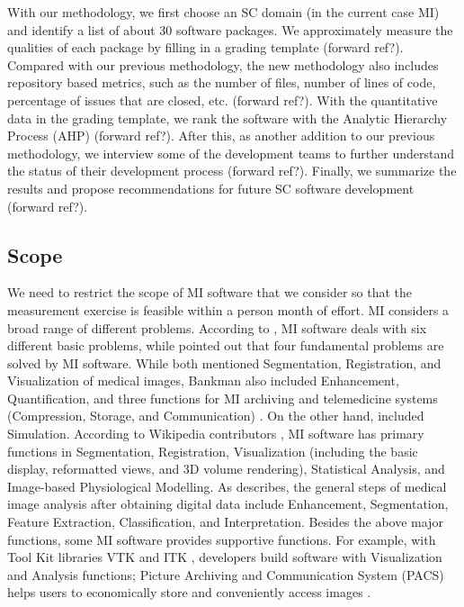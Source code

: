 \documentclass[preprint,12pt,authoryear]{elsarticle}
\begin{document}
With our methodology, we first choose an SC domain (in the current case MI) and
identify a list of about 30 software packages. We approximately measure the
qualities of each package by filling in a grading template (forward ref?).
Compared with our previous methodology, the new methodology also includes
repository based metrics, such as the number of files, number of lines of code,
percentage of issues that are closed, etc. (forward ref?).  With the
quantitative data in the grading template, we rank the software with the
Analytic Hierarchy Process (AHP) (forward ref?). After this, as another addition
to our previous methodology, we interview some of the development teams to
further understand the status of their development process (forward ref?).
Finally, we summarize the results and propose recommendations for future SC
software development (forward ref?).

\subsection{Scope} \label{sec_scope}

We need to restrict the scope of MI software that we consider so that the
measurement exercise is feasible within a person month of effort. MI considers a
broad range of different problems.  According to \citet{Bankman2000}, MI
software deals with six different basic problems, while \citet{Angenent2006}
pointed out that four fundamental problems are solved by MI software. While both
mentioned Segmentation, Registration, and Visualization of medical images,
Bankman also included Enhancement, Quantification, and three functions for MI
archiving and telemedicine systems (Compression, Storage, and Communication)
\citep{Bankman2000}. On the other hand, \citet{Angenent2006} included
Simulation. According to Wikipedia contributors \citep{enwiki:1034877594}, MI
software has primary functions in Segmentation, Registration, Visualization
(including the basic display, reformatted views, and 3D volume rendering),
Statistical Analysis, and Image-based Physiological Modelling. As
\citet{Kim2011} describes, the general steps of medical image analysis after
obtaining digital data include Enhancement, Segmentation, Feature Extraction,
Classification, and Interpretation. Besides the above major functions, some MI
software provides supportive functions. For example, with Tool Kit libraries VTK
\citep{SchroederEtAl2006} and ITK \citep{McCormick2014}, developers build
software with Visualization and Analysis functions; Picture Archiving and
Communication System (PACS) helps users to economically store and conveniently
access images \citep{Choplin1992}. 
\end{document}
